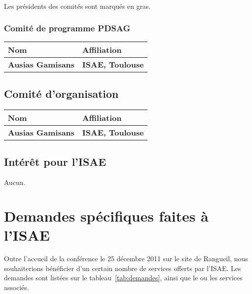 \documentclass[french]{supaero-orga}
\begin{document}
Les présidents des comités sont marqués en gras.

\subsubsection{Comité de programme PDSAG}
\label{sec:comite-scient-pdsag}

\begin{center}
  \begin{tabular}{l l}
    \toprule[1.5pt]
    \textbf{Nom} & \textbf{Affiliation}\\
    \midrule
    \textbf{Ausias Gamisans} & \textbf{ISAE, Toulouse} \\ 
    \bottomrule[1.5pt]
  \end{tabular}
\end{center}

\subsection{Comité d'organisation}
\label{sec:comite-dorganisation}

\begin{center}
  \begin{tabular}{l l}
    \toprule[1.5pt]
    \textbf{Nom} & \textbf{Affiliation}\\
    \midrule
    \textbf{Ausias Gamisans} & \textbf{ISAE, Toulouse}\\
    \bottomrule[1.5pt]
  \end{tabular}
\end{center}

\subsection{Intérêt pour l'ISAE}
\label{sec:interet-pour-lisae}

Aucun.

\section{Demandes spécifiques faites à l'ISAE}
\label{sec:demand-spec-lisae}

Outre l'accueil de la conférence le 25 décembre 2011 sur le site de
Rangueil, nous souhaiterions bénéficier d'un certain nombre de
services offerts par l'ISAE. Les demandes sont listées sur le
tableau~\ref{tab:demandes}, ainsi que le ou les services associés.
\end{document}
